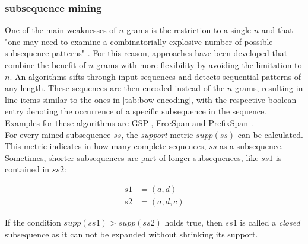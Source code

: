 \subsubsection*{subsequence mining}
One of the main weaknesses of $n$-grams is the restriction to a single $n$ and that "one may need to examine a combinatorially explosive
number of possible subsequence patterns" \cite{pei2001prefixspan}. For this reason, approaches have been developed that combine the benefit of $n$-grams with more flexibility by avoiding the limitation to $n$. An algorithms sifts through input sequences and detects sequential patterns of any length. These sequences are then encoded instead of the $n$-grams, resulting in line items similar to the ones in \autoref{tab:bow-encoding}, with the respective boolean entry denoting the occurrence of a specific subsequence in the sequence. Examples for these algorithms are GSP \cite{srikant1996gsp}, FreeSpan \cite{han2000freespan} and PrefixSpan \cite{pei2001prefixspan}.\\

For every mined subsequence $ss$, the \textit{support} metric $supp(ss)$ can be calculated. This metric indicates in how many complete sequences, $ss$ as a subsequence. Sometimes, shorter subsequences are part of longer subsequences, like $ss1$ is contained in $ss2$:

\begin{equation*}
\begin{split}
s1 &= (a,d)\\
s2 &= (a,d,c)
\end{split}
\end{equation*}

If the condition $supp(ss1) > supp(ss2)$ holds true, then $ss1$ is called a \textit{closed} subsequence as it can not be expanded without shrinking its support.
